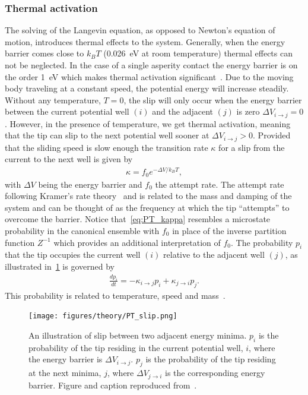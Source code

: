 \subsubsection{Thermal activation}
The solving of the Langevin equation, as opposed to Newton's equation of motion, introduces thermal effects to the system. Generally, when the energy barrier comes close to $k_B T$ (\SI{0.026}{eV} at room temperature) thermal effects can not be neglected. In the case of a single asperity contact the energy barrier is on the order \SI{1}{eV} which makes thermal activation significant~\cite{Yalin_2011}. Due to the moving body traveling at a constant speed, the potential energy will increase steadily. Without any temperature, $T = 0$, the slip will only occur when the energy barrier between the current potential well $(i)$ and the adjacent $(j)$ is zero $\Delta V_{i\to j} = 0$. However, in the presence of temperature, we get thermal activation, meaning that the tip can slip to the next potential well sooner at $\Delta V_{i\to j} > 0$. Provided that the sliding speed is slow enough the transition rate $\kappa$ for a slip from the current to the next well is given by
\begin{align}
  \kappa = f_0 e^{-\Delta V / k_B T},
  \label{eq:PT_kappa}
\end{align}
with $\Delta V$ being the energy barrier and $f_0$ the attempt rate. The attempt rate following Kramer’s rate theory~\cite{RevModPhys.62.251} and is related to the mass and damping of the system and can be thought of as the frequency at which the tip ``attempts'' to overcome the barrier. Notice that~\cref{eq:PT_kappa} resembles a microstate probability in the canonical ensemble with $f_0$ in place of the inverse partition function $Z^{-1}$ which provides an additional interpretation of $f_0$. The probability $p_i$ that the tip occupies the current well $(i)$ relative to the adjacent well $(j)$, as illustrated in~\cref{fig:PT_slip} is governed by 
\begin{align}
  \frac{dp_i}{dt} = -\kappa_{i\to j}p_i + \kappa_{j\to i}p_j.
  \label{eq:dpdt_PT}
\end{align}
This probability is related to temperature, speed and mass~\cite{Yalin_2011}.

\begin{figure}[H]
  \centering
  \texttt{[image: figures/theory/PT\_slip.png]}
  \caption{An illustration of slip between two adjacent energy minima. $p_i$ is the probability of the tip residing in the current potential well, $i$, where the energy barrier is $\Delta V_{i \rightarrow j}$. $p_j$ is the probability of the tip residing at the next minima, $j$, where $\Delta V_{j \rightarrow i}$ is the corresponding energy barrier. Figure and caption reproduced from~\cite{Yalin_2011}.}
  \label{fig:PT_slip}
\end{figure}


